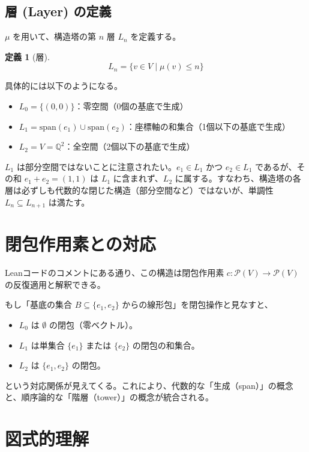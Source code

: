\documentclass[11pt, a4paper]{article}
\newtheorem{definition}{定義}[section]
\begin{document}
\subsection{層 (Layer) の定義}

$\mu$ を用いて、構造塔の第 $n$ 層 $L_n$ を定義する。

\begin{definition}[層]
\[
L_n = \{ v \in V \mid \mu(v) \leq n \}
\]
\end{definition}

具体的には以下のようになる。
\begin{itemize}
    \item $L_0 = \{ (0,0) \}$：零空間（0個の基底で生成）
    \item $L_1 = \text{span}(e_1) \cup \text{span}(e_2)$：座標軸の和集合（1個以下の基底で生成）
    \item $L_2 = V = \mathbb{Q}^2$：全空間（2個以下の基底で生成）
\end{itemize}

\begin{tcolorbox}[title=注意点, colback=yellow!10!white, colframe=yellow!50!black]
$L_1$ は部分空間ではないことに注意されたい。$e_1 \in L_1$ かつ $e_2 \in L_1$ であるが、その和 $e_1 + e_2 = (1, 1)$ は $L_1$ に含まれず、$L_2$ に属する。すなわち、構造塔の各層は必ずしも代数的な閉じた構造（部分空間など）ではないが、単調性 $L_n \subseteq L_{n+1}$ は満たす。
\end{tcolorbox}

\section{閉包作用素との対応}

Leanコードのコメントにある通り、この構造は閉包作用素 $c: \mathcal{P}(V) \to \mathcal{P}(V)$ の反復適用と解釈できる。

もし「基底の集合 $B \subseteq \{e_1, e_2\}$ からの線形包」を閉包操作と見なすと、
\begin{itemize}
    \item $L_0$ は $\emptyset$ の閉包（零ベクトル）。
    \item $L_1$ は単集合 $\{e_1\}$ または $\{e_2\}$ の閉包の和集合。
    \item $L_2$ は $\{e_1, e_2\}$ の閉包。
\end{itemize}
という対応関係が見えてくる。これにより、代数的な「生成（span）」の概念と、順序論的な「階層（tower）」の概念が統合される。

\section{図式的理解}
\end{document}
